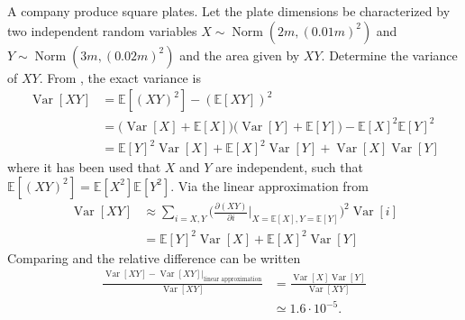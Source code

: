 \begin{example}
	A company produce square plates. Let the plate dimensions be characterized by two independent random variables $X\sim \operatorname{Norm}(2m,(0.01m)^2)$ and $Y\sim \operatorname{Norm}(3m,(0.02m)^2)$ and the area given by $XY$. Determine the variance of $XY$. From , the exact variance is
	\begin{equation}
		\label{eq:var1}
		\begin{split}
			\operatorname{Var}[XY]&=\mathbb{E}[(XY)^2]-(\mathbb{E}[XY])^2\\
			&=\bigg(\operatorname{Var}[X]+\mathbb{E}[X]\bigg)\bigg(\operatorname{Var}[Y]+\mathbb{E}[Y]\bigg)-\mathbb{E}[X]^2\mathbb{E}[Y]^2\\
			&=\mathbb{E}[Y]^2\operatorname{Var}[X]+\mathbb{E}[X]^2\operatorname{Var}[Y]+\operatorname{Var}[X]\operatorname{Var}[Y]
		\end{split}
	\end{equation}
	where it has been used that $X$ and $Y$ are independent, such that $\mathbb{E}[(XY)^2]=\mathbb{E}[X^2]\mathbb{E}[Y^2]$.	Via the linear approximation from 
	\begin{equation}
		\label{eq:var2}
		\begin{split}
			\operatorname{Var}[XY]&\approx\sum_{i = X,Y} \bigg( \frac{\partial (XY)}{\partial i}\bigg|_{X = \mathbb{E}[X],Y = \mathbb{E}[Y]}  \bigg)^2\operatorname{Var}[i]\\
			&=\mathbb{E}[Y]^2\operatorname{Var}[X]+\mathbb{E}[X]^2\operatorname{Var}[Y]
		\end{split}
	\end{equation}
	Comparing  and  the relative difference can be written
	\begin{equation}
		\begin{split}
			\frac{\operatorname{Var}[XY]-\operatorname{Var}[XY]|_{\text{linear approximation}}}{\operatorname{Var}[XY]} &= \frac{\operatorname{Var}[X]\operatorname{Var}[Y]}{\operatorname{Var}[XY]}\\
			& \simeq 1.6\cdot 10^{-5}.
		\end{split}
	\end{equation}
	
\end{example}

